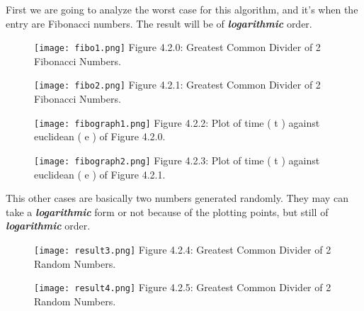\documentclass[10pt,a4paper]{article}
\begin{document}
First we are going to analyze the worst case for this algorithm, and it's when the entry are Fibonacci numbers. The result will be of {\bfseries\itshape logarithmic} order.

\begin{figure}[H]
\texttt{[image: fibo1.png]}
\centering \linebreak \linebreak Figure 4.2.0: Greatest Common Divider of 2 Fibonacci Numbers.
\end{figure}

\begin{figure}[H]
\texttt{[image: fibo2.png]}
\centering \linebreak \linebreak Figure 4.2.1: Greatest Common Divider of 2 Fibonacci Numbers.
\end{figure}

\begin{multicols}{2}
\begin{figure}[H]
\texttt{[image: fibograph1.png]}
\centering \linebreak \linebreak Figure 4.2.2: Plot of time ( t ) against euclidean ( e ) of Figure 4.2.0.
\end{figure}

\begin{figure}[H]
\texttt{[image: fibograph2.png]}
\centering \linebreak \linebreak Figure 4.2.3: Plot of time ( t ) against euclidean ( e ) of Figure 4.2.1.
\end{figure}
\end{multicols} \pagebreak

This other cases are basically two numbers generated randomly. They may can take a {\bfseries\itshape logarithmic} form or not because of the plotting points, but still of {\bfseries\itshape logarithmic} order.

\begin{figure}[H]
\texttt{[image: result3.png]}
\centering \linebreak \linebreak Figure 4.2.4: Greatest Common Divider of 2 Random Numbers.
\end{figure}

\begin{figure}[H]
\texttt{[image: result4.png]}
\centering \linebreak \linebreak Figure 4.2.5: Greatest Common Divider of 2 Random Numbers.
\end{figure}
\end{document}
